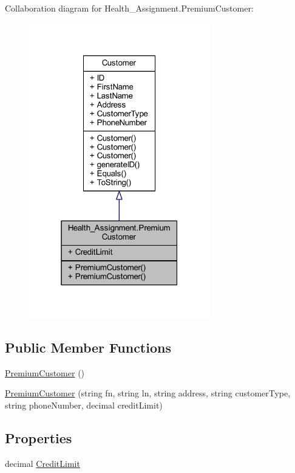 Collaboration diagram for Health\+\_\+\+Assignment.\+Premium\+Customer\+:\nopagebreak
\begin{figure}[H]
\begin{center}
\leavevmode
\includegraphics[width=223pt]{class_health___assignment_1_1_premium_customer__coll__graph}
\end{center}
\end{figure}
\subsection*{Public Member Functions}
\begin{DoxyCompactItemize}
\item 
\hyperlink{class_health___assignment_1_1_premium_customer_a5f0373b23b0cce30d299a119c9c18016}{Premium\+Customer} ()
\item 
\hyperlink{class_health___assignment_1_1_premium_customer_aa43af32924b5a6f7dddb59b130f61f23}{Premium\+Customer} (string fn, string ln, string address, string customer\+Type, string phone\+Number, decimal credit\+Limit)
\end{DoxyCompactItemize}
\subsection*{Properties}
\begin{DoxyCompactItemize}
\item 
decimal \hyperlink{class_health___assignment_1_1_premium_customer_afce0178dd2927338913c5499f5efdc3d}{Credit\+Limit}
\end{DoxyCompactItemize}


